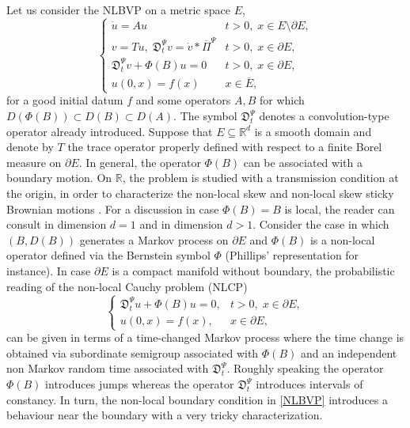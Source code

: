 \documentclass[11pt,a4paper]{article}
\theoremstyle{plain}
\theoremstyle{definition}
\theoremstyle{remark}
\begin{document}
	Let us consider the NLBVP on a metric space $E$,
	\begin{equation}
		\label{NLBVP}
		\left\lbrace
		\begin{array}{ll}
			\displaystyle \dot{u} = A u & t>0,\; x \in E \setminus \partial E,\\
			\displaystyle v= Tu, \; \mathfrak{D}^\Psi_t v = \dot{v} * \overline{\Pi}^\Psi & t>0, \; x \in \partial E,\\
			\displaystyle \mathfrak{D}^\Psi_t v + \Phi(B) u = 0 & t>0,\; x \in \partial E,\\
			\displaystyle u(0,x) = f(x) & x \in \overline{E},
		\end{array}
		\right .
	\end{equation}
	for a good initial datum $f$ and some operators $A,B$ for which $D(\Phi(B)) \subset D(B) \subset D(A)$. The symbol $\mathfrak{D}^\Psi_t$ denotes a convolution-type operator already introduced. Suppose that $E \subseteq \mathbb{R}^d$ is a smooth  domain and denote by $T$ the trace operator properly defined with respect to a finite Borel measure on $\partial E$. In general, the operator $\Phi(B)$ can be associated with a boundary motion. On $\mathbb{R}$, the problem is studied with a transmission condition at the origin, in order to characterize the non-local skew and non-local skew sticky Brownian motions \cite{colantoni2025non}. For a discussion in case $\Phi(B)=B$ is local, the reader can consult \cite{d2022fractionalsticky} in dimension $d=1$ and \cite{d2024fractionalsticky} in dimension $d>1$. Consider the case in which $(B, D(B))$ generates a Markov process on $\partial E$ and $\Phi(B)$ is a non-local operator defined via the Bernstein symbol $\Phi$ (Phillips' representation for instance). In case $\partial E$ is a compact manifold without boundary, the probabilistic reading of the non-local Cauchy problem (NLCP)
	\begin{equation}
		\label{NLCP}
		\left\lbrace
		\begin{array}{ll}
			\displaystyle \mathfrak{D}^\Psi_t u + \Phi(B) u = 0, & t>0,\; x \in \partial E,\\
			\displaystyle u(0,x) = f(x), & x \in \partial E,
		\end{array}
		\right .
	\end{equation}
	can be given in terms of a time-changed Markov process where the time change is obtained via subordinate semigroup associated with $\Phi(B)$ and an independent non Markov random time associated with $\mathfrak{D}^\Psi_t$. Roughly speaking the operator $\Phi(B)$ introduces jumps whereas the operator $\mathfrak{D}^\Psi_t$ introduces intervals of constancy. In turn, the non-local boundary condition in \eqref{NLBVP} introduces a behaviour near the boundary with a very tricky characterization. 
	
\end{document}
